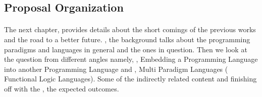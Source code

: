 \documentclass[proposal.tex]{subfiles}
\begin{document}


\subsection{Proposal Organization}

\paragraph{}
The next chapter,  provides details about the short comings of the previous works and the road to a 
better future. , the background talks about the programming paradigms and languages in general and 
the ones in question. Then we look at the question from different angles namely, ,  Embedding a 
Programming Language into another Programming Language and  , Multi Paradigm Languages (
Functional Logic Languages). Some of the indirectly related content  and finishing off with the 
, the expected outcomes.     

\end{document}
